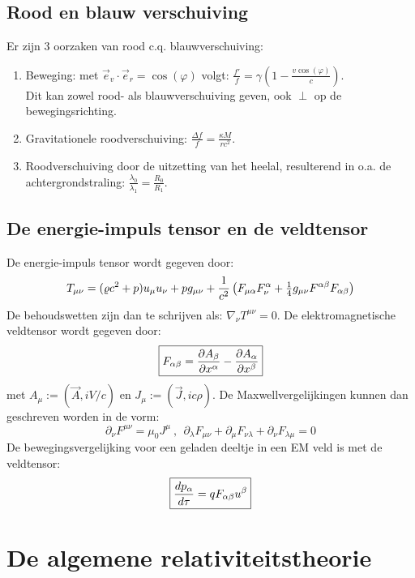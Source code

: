 \subsection{Rood en blauw verschuiving}
Er zijn 3 oorzaken van rood c.q. blauwverschuiving:
\begin{enumerate}
\item Beweging: met $\vec{e}_v\cdot\vec{e}_r=\cos(\varphi)$ volgt:
      $\displaystyle \frac{f'}{f}=\gamma\left(1-\frac{v\cos(\varphi)}{c}\right)$.\\
      Dit kan zowel rood- als blauwverschuiving geven, ook $\perp$ op de
      bewegingsrichting.
\item Gravitationele roodverschuiving: $\displaystyle\frac{\Delta f}{f}=\frac{\kappa M}{rc^2}$.
\item Roodverschuiving door de uitzetting van het heelal, resulterend in o.a.
      de achtergrondstraling: $\displaystyle\frac{\lambda_0}{\lambda_1}=\frac{R_0}{R_1}$.
\end{enumerate}

\subsection{De energie-impuls tensor en de veldtensor}
De energie-impuls tensor wordt gegeven door:
\[
T_{\mu\nu}=(\varrho c^2+p)u_\mu u_\nu+pg_{\mu\nu}+\frac{1}{c^2}
\left(F_{\mu\alpha}F^\alpha_\nu+\mbox{$\frac{1}{4}$} g_{\mu\nu}F^{\alpha\beta}F_{\alpha\beta}\right)
\]
De behoudswetten zijn dan te schrijven als: $\nabla_\nu T^{\mu\nu}=0$. De
elektromagnetische veldtensor wordt gegeven door:
\[
\mbox{\fbox{$\displaystyle F_{\alpha\beta}=\frac{\partial A_\beta}{\partial x^\alpha}-\frac{\partial A_\alpha}{\partial x^\beta}$}}
\]
met $A_\mu:=(\vec{A},iV/c)$ en $J_\mu:=(\vec{J},ic\rho)$. De
Maxwellvergelijkingen kunnen dan geschreven worden in de vorm:
\[
\partial_\nu F^{\mu\nu}=\mu_0J^\mu~,~~
\partial_\lambda F_{\mu\nu}+\partial_\mu F_{\nu\lambda}+\partial_\nu F_{\lambda\mu}=0
\]
De bewegingsvergelijking voor een geladen deeltje in een EM veld is met de
veldtensor:
\[
\mbox{\fbox{$\displaystyle\frac{dp_\alpha}{d\tau}=qF_{\alpha\beta}u^\beta$}}
\]

\section{De algemene relativiteitstheorie}
